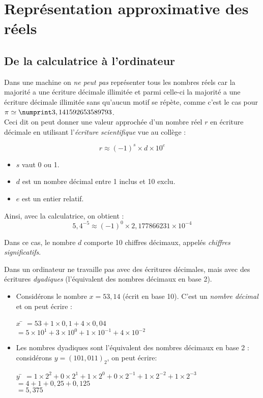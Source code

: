 \chapter{Représentation approximative des réels}


\section{De la calculatrice à l'ordinateur}
Dans une machine on \textit{ne peut pas} représenter tous les nombres réels car la majorité a une écriture décimale illimitée et parmi celle-ci la majorité a une écriture décimale illimitée sans qu'aucun motif se répète, comme c'est le cas pour $\pi\simeq\np{3,141 592 653 589 793}$.\\
Ceci dit on peut donner une valeur approchée d'un nombre réel $r$ en écriture décimale en
utilisant l'\textit{écriture scientifique} vue au collège :

$$\boxed{r\approx (-1)^s\times d\times 10^{e}}$$

\begin{itemize}
    \item   $s$ vaut 0 ou 1.
    \item   $d$ est un nombre décimal entre 1 inclus et 10 exclu.
    \item   $e$ est un entier relatif.
\end{itemize}

Ainsi, avec la calculatrice, on obtient :
$$\boxed{5,4^{-5}\approx (-1)^0\times 2,177866231\times10^{-4}}$$

Dans ce cas, le nombre $d$ comporte 10 chiffres décimaux, appelés \textit{chiffres significatifs}.

Dans un ordinateur ne travaille pas avec des écritures décimales, mais avec des écritures \textit{dyadiques} (l'équivalent des nombres décimaux en
base 2).
\begin{exemple}
    \begin{itemize}
        \item   Considérons le nombre $x = 53,14$ (écrit en base 10). C'est un \textit{nombre décimal} et on peut écrire :
              \begin{tabbing}
                  $x$ \=  $=53+1\times 0,1+4\times 0,04$\\
                  \>  $=5\times 10^1+3\times 10^0+1\times 10^{-1}+4\times 10^{-2}$
              \end{tabbing}
        \item   Les nombres dyadiques sont l'équivalent des nombres décimaux en base 2 : considérons $y=(101,011)_2 $, on peut écrire:
              \begin{tabbing}
                  $y$ \=  $=1\times 2^2+0\times 2^1+1\times 2^0+0\times 2^{-1}+1\times 2^{-2}+1\times 2^{-3}$\\
                  \>  $=4+1+0,25+0,125$\\
                  \>  $=5,375$
              \end{tabbing}
    \end{itemize}
\end{exemple}

